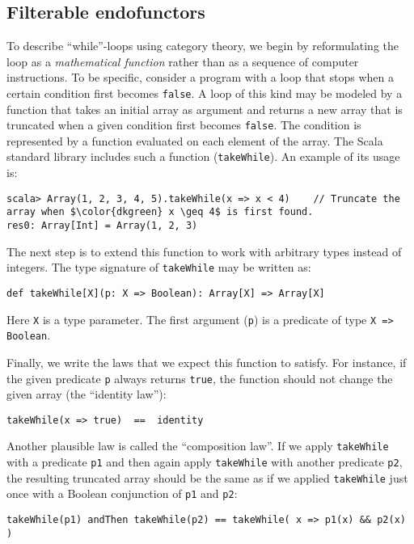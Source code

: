 \subsection*{Filterable endofunctors}

To describe \textsf{``}while\textsf{''}-loops using category theory, we begin by reformulating
the loop as a \emph{mathematical function} rather than as a sequence
of computer instructions. To be specific, consider a program with
a loop that stops when a certain condition first becomes \lstinline!false!.
A loop of this kind may be modeled by a function that takes an initial
array as argument and returns a new array that is truncated when a
given condition first becomes \lstinline!false!. The condition is
represented by a function evaluated on each element of the array.
The Scala standard library includes such a function (\lstinline!takeWhile!).
An example of its usage is:
\begin{lstlisting}[mathescape=true]
scala> Array(1, 2, 3, 4, 5).takeWhile(x => x < 4)    // Truncate the array when $\color{dkgreen} x \geq 4$ is first found.
res0: Array[Int] = Array(1, 2, 3) 
\end{lstlisting}
The next step is to extend this function to work with arbitrary types
instead of integers. The type signature of \lstinline!takeWhile!
may be written as:
\begin{lstlisting}
def takeWhile[X](p: X => Boolean): Array[X] => Array[X]
\end{lstlisting}
Here \lstinline!X! is a type parameter. The first argument (\lstinline!p!)
is a predicate of type \lstinline!X => Boolean!.

Finally, we write the laws that we expect this function to satisfy.
For instance, if the given predicate \lstinline!p! always returns
\lstinline!true!, the function should not change the given array
(the \textsf{``}identity law\textsf{''}):
\begin{lstlisting}
takeWhile(x => true)  ==  identity
\end{lstlisting}
Another plausible law is called the \textsf{``}composition law\textsf{''}. If we apply
\lstinline!takeWhile! with a predicate \lstinline!p1! and then again
apply \lstinline!takeWhile! with another predicate \lstinline!p2!,
the resulting truncated array should be the same as if we applied
\lstinline!takeWhile! just once with a Boolean conjunction of \lstinline!p1!
and \lstinline!p2!: 
\begin{lstlisting}
takeWhile(p1) andThen takeWhile(p2) == takeWhile( x => p1(x) && p2(x) )
\end{lstlisting}

